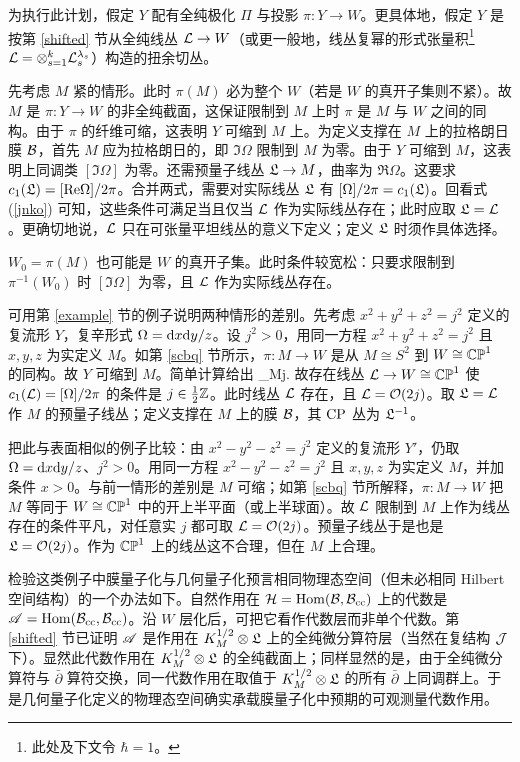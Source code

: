 为执行此计划，假定 $Y$ 配有全纯极化 $\varPi$ 与投影 $\pi:Y\to W$。更具体地，假定 $Y$ 是按第 \ref{shifted} 节从全纯线丛 ${\mathcal L}\to W$（或更一般地，线丛复幂的形式张量积\footnote{此处及下文令 $\hbar=1$。}${\mathcal L}=\otimes_{s=1}^k{\mathcal L}_s^{\lambda_s}$）构造的扭余切丛。

先考虑 $M$ 紧的情形。此时 $\pi(M)$ 必为整个 $W$（若是 $W$ 的真开子集则不紧）。故 $M$ 是 $\pi:Y\to W$ 的非全纯截面，这保证限制到 $M$ 上时 $\pi$ 是 $M$ 与 $W$ 之间的同构。由于 $\pi$ 的纤维可缩，这表明 $Y$ 可缩到 $M$ 上。为定义支撑在 $M$ 上的拉格朗日膜 ${\mathcal B}$，首先 $M$ 应为拉格朗日的，即 $\Im\Omega$ 限制到 $M$ 为零。由于 $Y$ 可缩到 $M$，这表明上同调类 $[\Im\Omega]$ 为零。还需预量子线丛 ${\mathfrak L}\to M$，曲率为 $\Re\Omega$。这要求 $c_1({\mathfrak L})=[{\mathrm{Re}}\Omega]/2\pi$。合并两式，需要对实际线丛 ${\mathfrak L}$ 有 $[\Omega]/2\pi=c_1({\mathfrak L})$。回看式 (\ref{jnko}) 可知，这些条件可满足当且仅当 ${\mathcal L}$ 作为实际线丛存在；此时应取 ${\mathfrak L}={\mathcal L}$。更确切地说，${\mathcal L}$ 只在可张量平坦线丛的意义下定义；定义 ${\mathfrak L}$ 时须作具体选择。

$W_0=\pi(M)$ 也可能是 $W$ 的真开子集。此时条件较宽松：只要求限制到 $\pi^{-1}(W_0)$ 时 $[\Im\Omega]$ 为零，且 ${\mathcal L}$ 作为实际线丛存在。

可用第 \ref{example} 节的例子说明两种情形的差别。先考虑 $x^2+y^2+z^2=j^2$ 定义的复流形 $Y$，复辛形式 $\Omega={\mathrm d} x{\mathrm d} y/z$。设 $j^2>0$，用同一方程 $x^2+y^2+z^2=j^2$ 且 $x,y,z$ 为实定义 $M$。如第 \ref{scbq} 节所示，$\pi:M\to W$ 是从 $M\cong S^2$ 到 $W\cong{\mathbb{CP}}^1$ 的同构。故 $Y$ 可缩到 $M$。简单计算给出
\be\label{shortc} \int_M\pi j. \ee
故存在线丛 ${\mathcal L}\to W\cong{\mathbb{CP}}^1$ 使 $c_1({\mathcal L})=[\Omega]/2\pi$ 的条件是 $j\in\frac12{\mathbb Z}$。此时线丛 ${\mathcal L}$ 存在，且 ${\mathcal L}={\mathcal O}(2j)$。取 ${\mathfrak L}={\mathcal L}$ 作 $M$ 的预量子线丛；定义支撑在 $M$ 上的膜 ${\mathcal B}$，其 ${\mathrm{CP}}$ 丛为 ${\mathfrak L}^{-1}$。

把此与表面相似的例子比较：由 $x^2-y^2-z^2=j^2$ 定义的复流形 $Y'$，仍取 $\Omega={\mathrm d} x{\mathrm d} y/z$、$j^2>0$。用同一方程 $x^2-y^2-z^2=j^2$ 且 $x,y,z$ 为实定义 $M$，并加条件 $x>0$。与前一情形的差别是 $M$ 可缩；如第 \ref{scbq} 节所解释，$\pi:M\to W$ 把 $M$ 等同于 $W\cong{\mathbb{CP}}^1$ 中的开上半平面（或上半球面）。故 ${\mathcal L}$ 限制到 $M$ 上作为线丛存在的条件平凡，对任意实 $j$ 都可取 ${\mathcal L}={\mathcal O}(2j)$。预量子线丛于是也是 ${\mathfrak L}={\mathcal O}(2j)$。作为 ${\mathbb{CP}}^1$ 上的线丛这不合理，但在 $M$ 上合理。

检验这类例子中膜量子化与几何量子化预言相同物理态空间（但未必相同 Hilbert 空间结构）的一个办法如下。自然作用在 ${\mathcal H}={\mathrm{Hom}}({\mathcal B},{\mathcal B}_{\mathrm{cc}})$ 上的代数是 ${\mathscr A}={\mathrm{Hom}}({\mathcal B}_{\mathrm{cc}},{\mathcal B}_{\mathrm{cc}})$。沿 $W$ 层化后，可把它看作代数层而非单个代数。第 \ref{shifted} 节已证明 ${\mathscr A}$ 是作用在 $K_M^{1/2}\otimes{\mathfrak L}$ 上的全纯微分算符层（当然在复结构 ${\mathcal J}$ 下）。显然此代数作用在 $K_M^{1/2}\otimes{\mathfrak L}$ 的全纯截面上；同样显然的是，由于全纯微分算符与 $\bar\partial$ 算符交换，同一代数作用在取值于 $K_M^{1/2}\otimes{\mathfrak L}$ 的所有 $\bar\partial$ 上同调群上。于是几何量子化定义的物理态空间确实承载膜量子化中预期的可观测量代数作用。

